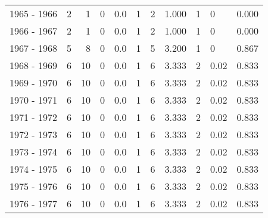 \begin{tabular}{lrrrrrrrllr}
1965 - 1966 &        2 &        1 &                 0 &               0.0 &                       1 &                          2 &       1.000 &             1 &          0 &             0.000 \\
1966 - 1967 &        2 &        1 &                 0 &               0.0 &                       1 &                          2 &       1.000 &             1 &          0 &             0.000 \\
1967 - 1968 &        5 &        8 &                 0 &               0.0 &                       1 &                          5 &       3.200 &             1 &          0 &             0.867 \\
1968 - 1969 &        6 &       10 &                 0 &               0.0 &                       1 &                          6 &       3.333 &             2 &       0.02 &             0.833 \\
1969 - 1970 &        6 &       10 &                 0 &               0.0 &                       1 &                          6 &       3.333 &             2 &       0.02 &             0.833 \\
1970 - 1971 &        6 &       10 &                 0 &               0.0 &                       1 &                          6 &       3.333 &             2 &       0.02 &             0.833 \\
1971 - 1972 &        6 &       10 &                 0 &               0.0 &                       1 &                          6 &       3.333 &             2 &       0.02 &             0.833 \\
1972 - 1973 &        6 &       10 &                 0 &               0.0 &                       1 &                          6 &       3.333 &             2 &       0.02 &             0.833 \\
1973 - 1974 &        6 &       10 &                 0 &               0.0 &                       1 &                          6 &       3.333 &             2 &       0.02 &             0.833 \\
1974 - 1975 &        6 &       10 &                 0 &               0.0 &                       1 &                          6 &       3.333 &             2 &       0.02 &             0.833 \\
1975 - 1976 &        6 &       10 &                 0 &               0.0 &                       1 &                          6 &       3.333 &             2 &       0.02 &             0.833 \\
1976 - 1977 &        6 &       10 &                 0 &               0.0 &                       1 &                          6 &       3.333 &             2 &       0.02 &             0.833 \\

\end{tabular}

